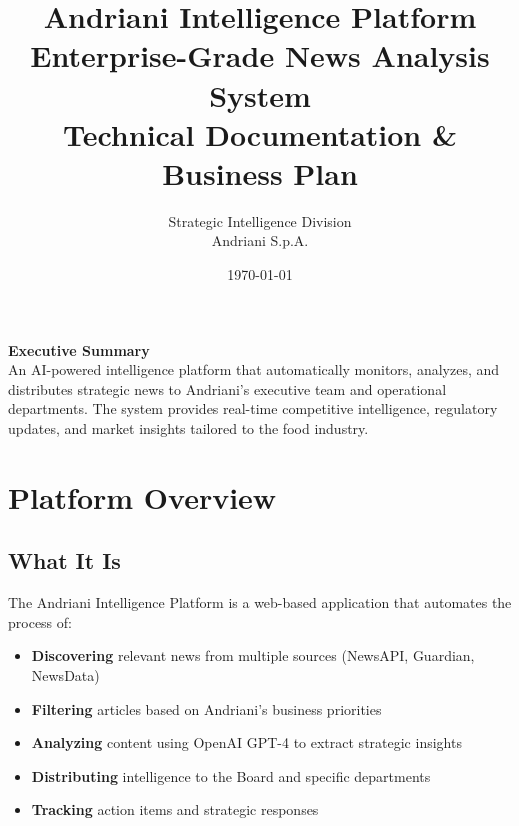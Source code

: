 \documentclass[11pt,a4paper]{article}
\title{\textbf{\Huge Andriani Intelligence Platform}\\
\vspace{0.5cm}
\Large Enterprise-Grade News Analysis System\\
\large Technical Documentation \& Business Plan}
\author{Strategic Intelligence Division\\Andriani S.p.A.}
\date{\today}
\begin{document}
\maketitle
\thispagestyle{empty}

\vspace{2cm}

\begin{center}
\begin{tcolorbox}[colback=blue!5!white,colframe=andrianiblue,width=14cm,arc=3mm,boxrule=1pt]
\centering
\large \textbf{Executive Summary}\\[0.5cm]
\normalsize
An AI-powered intelligence platform that automatically monitors, analyzes, and distributes strategic news to Andriani's executive team and operational departments. The system provides real-time competitive intelligence, regulatory updates, and market insights tailored to the food industry.
\end{tcolorbox}
\end{center}

\newpage
\tableofcontents
\newpage

\section{Platform Overview}

\subsection{What It Is}
The Andriani Intelligence Platform is a web-based application that automates the process of:
\begin{itemize}[leftmargin=*]
    \item \textbf{Discovering} relevant news from multiple sources (NewsAPI, Guardian, NewsData)
    \item \textbf{Filtering} articles based on Andriani's business priorities
    \item \textbf{Analyzing} content using OpenAI GPT-4 to extract strategic insights
    \item \textbf{Distributing} intelligence to the Board and specific departments
    \item \textbf{Tracking} action items and strategic responses
\end{itemize}
\end{document}
